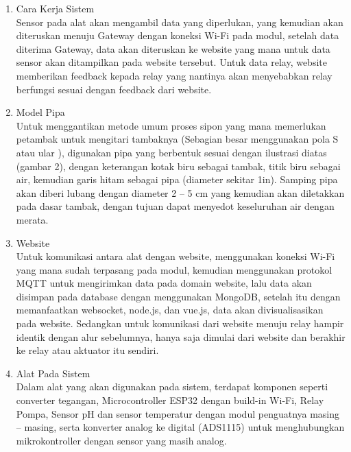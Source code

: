 \begin{enumerate}
\item Cara Kerja Sistem \\
Sensor pada alat akan mengambil data yang diperlukan, yang kemudian akan diteruskan menuju Gateway dengan koneksi Wi-Fi pada modul, setelah data diterima Gateway, data akan diteruskan ke website yang mana untuk data sensor akan ditampilkan pada website tersebut. Untuk data relay, website memberikan feedback kepada relay yang nantinya akan menyebabkan relay berfungsi sesuai dengan feedback dari website.
\item Model Pipa \\
Untuk menggantikan metode umum proses sipon yang mana memerlukan petambak untuk mengitari tambaknya (Sebagian besar menggunakan pola S atau ular ), digunakan pipa yang berbentuk sesuai dengan ilustrasi diatas (gambar 2), dengan keterangan kotak biru sebagai tambak, titik biru sebagai air, kemudian garis hitam sebagai pipa (diameter sekitar 1in). Samping pipa akan diberi lubang dengan diameter 2 – 5 cm yang kemudian akan diletakkan pada dasar tambak, dengan tujuan dapat menyedot keseluruhan air dengan merata.
\item Website \\
Untuk komunikasi antara alat dengan website, menggunakan koneksi Wi-Fi yang mana sudah terpasang pada modul, kemudian menggunakan protokol MQTT untuk mengirimkan data pada domain website, lalu data akan disimpan pada database dengan menggunakan MongoDB, setelah itu dengan memanfaatkan websocket, node.js, dan vue.js, data akan divisualisasikan pada website. Sedangkan untuk komunikasi dari website menuju relay hampir identik dengan alur sebelumnya, hanya saja dimulai dari website dan  berakhir ke relay atau aktuator itu sendiri.
\item Alat Pada Sistem \\
Dalam alat yang  akan digunakan pada sistem, terdapat komponen seperti  converter tegangan, Microcontroller ESP32 dengan build-in Wi-Fi, Relay Pompa, Sensor pH dan sensor temperatur dengan modul penguatnya masing – masing,  serta konverter analog ke digital (ADS1115) untuk menghubungkan mikrokontroller dengan sensor yang masih analog.
\end{enumerate}